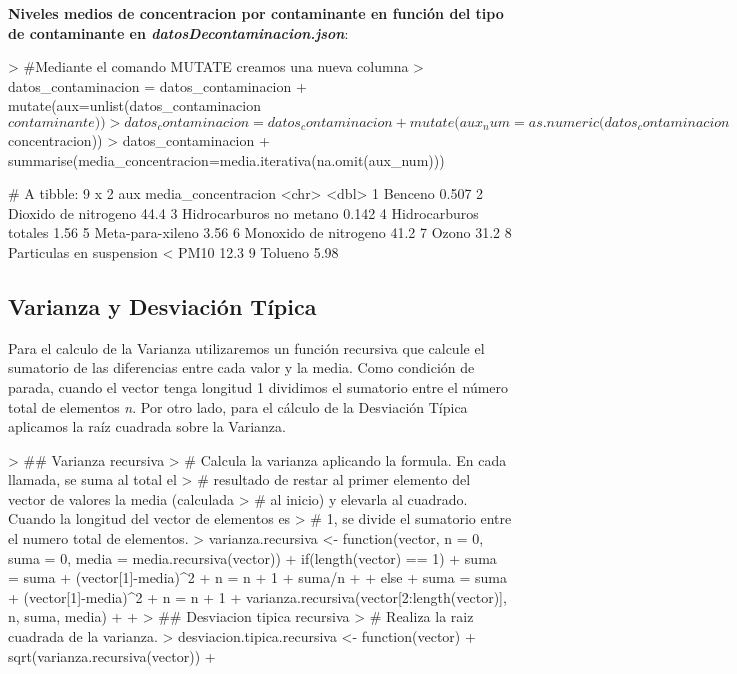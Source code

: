 \documentclass [a4paper] {article}
\begin{document}
\textbf{Niveles medios de concentracion por contaminante en función del tipo de contaminante en \textit{datosDecontaminacion.json}}:
\begin{Schunk}
\begin{Sinput}
> #Mediante el comando MUTATE creamos una nueva columna
> datos_contaminacion = datos_contaminacion %>% 
+ mutate(aux=unlist(datos_contaminacion$contaminante))
> datos_contaminacion = datos_contaminacion %>% 
+ mutate(aux_num=as.numeric(datos_contaminacion$concentracion))
> datos_contaminacion %>% group_by(aux) %>% 
+ summarise(media_concentracion=media.iterativa(na.omit(aux_num)))
\end{Sinput}
\begin{Soutput}
# A tibble: 9 x 2
  aux                             media_concentracion
  <chr>                                         <dbl>
1 Benceno                                       0.507
2 Dioxido de nitrogeno                         44.4  
3 Hidrocarburos no metano                       0.142
4 Hidrocarburos totales                         1.56 
5 Meta-para-xileno                              3.56 
6 Monoxido de nitrogeno                        41.2  
7 Ozono                                        31.2  
8 Parti­culas en suspension < PM10              12.3  
9 Tolueno                                       5.98 
\end{Soutput}
\end{Schunk}
\newpage
\subsection{Varianza y Desviación Típica}
Para el calculo de la Varianza utilizaremos un función recursiva que calcule el sumatorio de las
diferencias entre cada valor y la media. Como condición de parada, cuando el vector tenga longitud 1
dividimos el sumatorio entre el número total de elementos \textit{n}. Por otro lado, para el cálculo
de la Desviación Típica aplicamos la raíz cuadrada sobre la Varianza.
\begin{Schunk}
\begin{Sinput}
> ## Varianza recursiva
> # Calcula la varianza aplicando la formula. En cada llamada, se suma al total el
> # resultado de restar al primer elemento del vector de valores la media (calculada
> # al inicio) y elevarla al cuadrado. Cuando la longitud del vector de elementos es
> # 1, se divide el sumatorio entre el numero total de elementos.
> varianza.recursiva <- function(vector, n = 0, suma = 0, media = media.recursiva(vector)){
+     if(length(vector) == 1){
+         suma = suma + (vector[1]-media)^2
+         n = n + 1
+         suma/n
+     }
+     else{
+         suma = suma + (vector[1]-media)^2
+         n = n + 1
+         varianza.recursiva(vector[2:length(vector)], n, suma, media)
+     }
+ }
> ## Desviacion tipica recursiva
> # Realiza la raiz cuadrada de la varianza.
> desviacion.tipica.recursiva <- function(vector){
+ 	sqrt(varianza.recursiva(vector))
+ }
\end{Sinput}
\end{Schunk}
\end{document}
